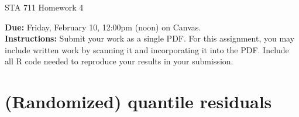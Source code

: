 \documentclass[11pt]{article}
\begin{document}
\begin{center}
\Large
STA 711 Homework 4\\
\normalsize
\vspace{5mm}
\end{center}

\noindent \textbf{Due:} Friday, February 10, 12:00pm (noon) on Canvas.\\ 

\noindent \textbf{Instructions:} Submit your work as a single PDF. For this assignment, you may include written work by scanning it and incorporating it into the PDF. Include all R code needed to reproduce your results in your submission.

\section*{(Randomized) quantile residuals}
\end{document}
